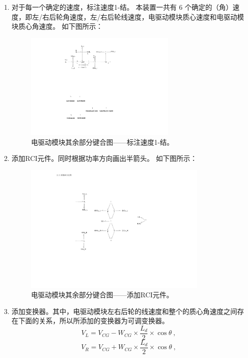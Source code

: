 \begin{enumerate}
	\item 对于每一个确定的速度，标注速度1-结。
	本装置一共有 6 个确定的（角）速度，即左/右后轮角速度，左/右后轮线速度，电驱动模块质心速度和电驱动模块质心角速度。
	如下图所示：
	\begin{figure}[!h]
		\centering
		\includegraphics[width=0.7\textwidth]{fig/4_6_bond.pdf}
		\caption{电驱动模块其余部分键合图——标注速度1-结。}\label{fig:4_6_bond}
	\end{figure}
	
	\item 添加RCI元件。同时根据功率方向画出半箭头。
	如下图所示：
	\begin{figure}[!h]
		\centering
		\includegraphics[width=0.85\textwidth]{fig/4_7_bond.pdf}
		\caption{电驱动模块其余部分键合图——添加RCI元件。}\label{fig:4_7_bond}
	\end{figure}
	
	\item 添加变换器。其中，电驱动模块左右后轮的线速度和整个的质心角速度之间存在下面的关系，所以所添加的变换器为可调变换器。
	\begin{equation}
	\label{equ:V_L}
	V_L
	=
	V_{CG}-W_{CG} \times \frac{L_d}{2} \times \cos \theta
	\ ,
	\end{equation}
	\begin{equation}
	\label{equ:V_R}
	V_R
	=
	V_{CG}+W_{CG} \times \frac{L_d}{2} \times \cos \theta
	\ ,
	\end{equation}
	

\end{enumerate}
